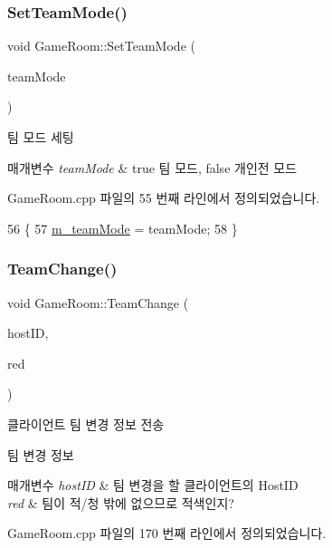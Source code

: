 \subsubsection{\texorpdfstring{Set\+Team\+Mode()}{SetTeamMode()}}
{\footnotesize\ttfamily void Game\+Room\+::\+Set\+Team\+Mode (\begin{DoxyParamCaption}\item[{bool}]{team\+Mode }\end{DoxyParamCaption})}



팀 모드 세팅 


\begin{DoxyParams}{매개변수}
{\em team\+Mode} & true 팀 모드, false 개인전 모드 \\
\hline
\end{DoxyParams}


Game\+Room.\+cpp 파일의 55 번째 라인에서 정의되었습니다.


\begin{DoxyCode}
56 \{
57     \hyperlink{class_game_room_aef7875998ee1bf83eb23e249b5659bc7}{m\_teamMode} = teamMode;
58 \}
\end{DoxyCode}
\mbox{\label{class_game_room_a8cb9973b88d0b81c19e5cefac287a79e}} 
\subsubsection{\texorpdfstring{Team\+Change()}{TeamChange()}}
{\footnotesize\ttfamily void Game\+Room\+::\+Team\+Change (\begin{DoxyParamCaption}\item[{Host\+ID}]{host\+ID,  }\item[{bool}]{red }\end{DoxyParamCaption})}



클라이언트 팀 변경 정보 전송 

팀 변경 정보


\begin{DoxyParams}{매개변수}
{\em host\+ID} & 팀 변경을 할 클라이언트의 Host\+ID \\
\hline
{\em red} & 팀이 적/청 밖에 없으므로 적색인지? \\
\hline
\end{DoxyParams}


Game\+Room.\+cpp 파일의 170 번째 라인에서 정의되었습니다.


